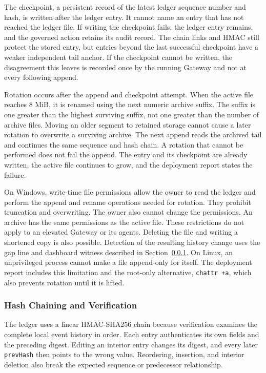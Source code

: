 The checkpoint, a persistent record of the latest ledger sequence number and hash, is written after the ledger entry. It cannot name an entry that has not reached the ledger file. If writing the checkpoint fails, the ledger entry remains, and the governed action retains its audit record. The chain links and HMAC still protect the stored entry, but entries beyond the last successful checkpoint have a weaker independent tail anchor. {\color{red}If the checkpoint cannot be written, the
disagreement this leaves is recorded once by the running Gateway and not at
every following append.}

Rotation occurs after the append and checkpoint attempt. When the active file reaches 8 MiB, it is renamed using the next numeric archive suffix. The suffix is one greater than the highest surviving suffix, not one greater than the number of archive files. Moving an older segment to retained storage cannot cause a later rotation to overwrite a surviving archive. The next append reads the archived tail and continues the same sequence and hash chain. {\color{red}A rotation that cannot be performed does not fail the
append. The entry and its checkpoint are already written, the active file
continues to grow, and the deployment report states the failure.}

{\color{red}On Windows, write-time file permissions allow the owner to read
the ledger and perform the append and rename operations needed for rotation.
They prohibit truncation and overwriting. The owner also cannot change the permissions.
An archive has the same permissions as the active file. These restrictions do
not apply to an elevated Gateway or its agents. Deleting the file and writing
a shortened copy is also possible. Detection of the resulting history change
uses the gap line and dashboard witness described in
Section~\ref{sec:gov-ledger-verification}. On Linux, an unprivileged process cannot make a file append-only for
itself. The deployment report includes this limitation and the root-only alternative,
\texttt{chattr +a}, which also prevents rotation until it is lifted.}

\FloatBarrier

\subsubsection{Hash Chaining and Verification}
\label{sec:gov-ledger-verification}

The ledger uses a linear HMAC-SHA256 chain because verification examines the complete local event history in order. Each entry authenticates its own fields and the preceding digest. Editing an interior entry changes its digest, and every later \texttt{prevHash} then points to the wrong value. Reordering, insertion, and interior deletion also break the expected sequence or predecessor relationship.

